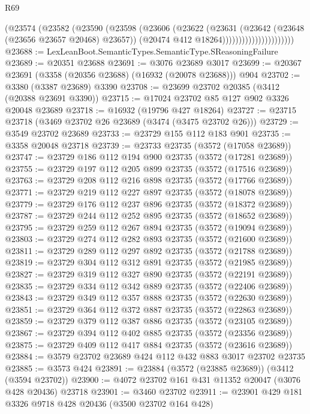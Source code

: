 \begin{lexlean}{R69}
\begin{coremodule}
                                (@23574
                                  (@23582
                                    (@23590
                                      (@23598
                                        (@23606
                                          (@23622
                                            (@23631
                                              (@23642 (@23648 (@23656 @23657 @20468) @23657))
                                              (@20474 @412 @18264))))))))))))))))))))))
@23688 := LexLeanBoot.SemanticTypes.SemanticType.SReasoningFailure
@23689 := @20351 @23688
@23691 := @3076 @23689 @3017
@23699 := @20367 @23691 (@3358 (@20356 @23688) (@16932 (@20078 @23688))) @904
@23702 := @3380 (@3387 @23689) @3390
@23708 := @23699 @23702 @20385 (@3412 (@20388 @23691 @3390))
@23715 := @17024 @23702 @85 @127 @902 @3326 @20048 @23689
@23718 := @16932 (@19796 @427 @18264)
@23727 := @23715 @23718 (@3469 @23702 @26 @23689 (@3474 (@3475 @23702 @26)))
@23729 := @3549 @23702 @23689
@23733 := @23729 @155 @112 @183 @901
@23735 := @3358 @20048 @23718
@23739 := @23733 @23735 (@3572 (@17058 @23689))
@23747 := @23729 @186 @112 @194 @900 @23735 (@3572 (@17281 @23689))
@23755 := @23729 @197 @112 @205 @899 @23735 (@3572 (@17516 @23689))
@23763 := @23729 @208 @112 @216 @898 @23735 (@3572 (@17766 @23689))
@23771 := @23729 @219 @112 @227 @897 @23735 (@3572 (@18078 @23689))
@23779 := @23729 @176 @112 @237 @896 @23735 (@3572 (@18372 @23689))
@23787 := @23729 @244 @112 @252 @895 @23735 (@3572 (@18652 @23689))
@23795 := @23729 @259 @112 @267 @894 @23735 (@3572 (@19094 @23689))
@23803 := @23729 @274 @112 @282 @893 @23735 (@3572 (@21600 @23689))
@23811 := @23729 @289 @112 @297 @892 @23735 (@3572 (@21788 @23689))
@23819 := @23729 @304 @112 @312 @891 @23735 (@3572 (@21985 @23689))
@23827 := @23729 @319 @112 @327 @890 @23735 (@3572 (@22191 @23689))
@23835 := @23729 @334 @112 @342 @889 @23735 (@3572 (@22406 @23689))
@23843 := @23729 @349 @112 @357 @888 @23735 (@3572 (@22630 @23689))
@23851 := @23729 @364 @112 @372 @887 @23735 (@3572 (@22863 @23689))
@23859 := @23729 @379 @112 @387 @886 @23735 (@3572 (@23105 @23689))
@23867 := @23729 @394 @112 @402 @885 @23735 (@3572 (@23356 @23689))
@23875 := @23729 @409 @112 @417 @884 @23735 (@3572 (@23616 @23689))
@23884 := @3579 @23702 @23689 @424 @112 @432 @883 @3017 @23702 @23735
@23885 := @3573 @424
@23891 := @23884 (@3572 (@23885 @23689)) (@3412 (@3594 @23702))
@23900 := @4072 @23702 @161 @431 @11352 @20047 (@3076 @428 @20436) @23718
@23901 := @3460 @23702
@23911 := @23901 @429 @181 @3326 @9718 @428 @20436 (@3500 @23702 @164 @428)

\end{coremodule}
\end{lexlean}
